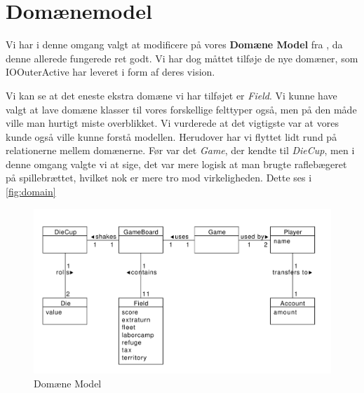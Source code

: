 \section{Domænemodel}
Vi har i denne omgang valgt at modificere på vores \textbf{Domæne Model} fra \citep{19del2}, da denne allerede fungerede ret godt. Vi har dog måttet tilføje de nye domæner, som IOOuterActive har leveret i form af deres vision.


Vi kan se at det eneste ekstra domæne vi har tilføjet er \textit{Field}. Vi kunne have valgt at lave domæne klasser til vores forskellige felttyper også, men på den måde ville man hurtigt miste overblikket. Vi vurderede at det vigtigste var at vores kunde også ville kunne forstå modellen. Herudover har vi flyttet lidt rund på relationerne mellem domænerne. Før var det \textit{Game}, der kendte til \textit{DieCup}, men i denne omgang valgte vi at sige, det var mere logisk at man brugte raflebægeret på spillebrættet, hvilket nok er mere tro mod virkeligheden. Dette ses i \vref{fig:domain}

\begin{figure}[!ht]
    \centering
    \includegraphics[width=1\textwidth]{Domainmodel.pdf}
    \caption[<Text for the list of figures>]{Domæne Model}
    \label{fig:domain}
\end{figure}